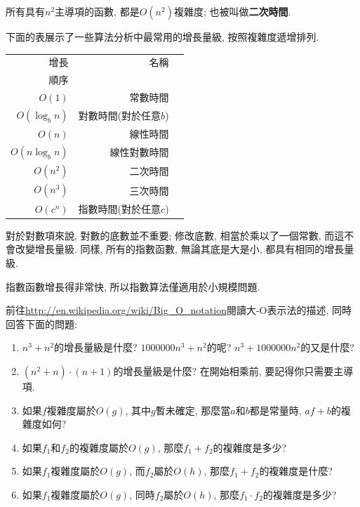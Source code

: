 \documentclass[10pt]{book}
\begin{document}
所有具有$n^2$主導項的函數, 都是$O(n^2)$複雜度; 也被叫做{\bf 二次時間}. 

下面的表展示了一些算法分析中最常用的增長量級, 
按照複雜度遞增排列. 

\begin{tabular}{|r|r|r|}
\hline
增長     &   名稱      \\
順序      &               \\
\hline
$O(1)$             & 常數時間 \\
$O(\log_b n)$      & 對數時間(對於任意$b$) \\
$O(n)$             & 線性時間 \\
$O(n \log_b n)$    & 線性對數時間 \\
$O(n^2)$           & 二次時間   \\
$O(n^3)$           & 三次時間   \\
$O(c^n)$           & 指數時間(對於任意$c$)  \\
\hline
\end{tabular}

對於對數項來說, 對數的底數並不重要;
修改底數, 相當於乘以了一個常數, 
而這不會改變增長量級. 
同樣, 所有的指數函數, 無論其底是大是小, 都具有相同的增長量級. 

指數函數增長得非常快, 所以指數算法僅適用於小規模問題. 


\begin{exercise}
前往\url{http://en.wikipedia.org/wiki/Big_O_notation}閱讀大-O表示法的描述, 
同時回答下面的問題:

\begin{enumerate}
\item $n^3 + n^2$的增長量級是什麼? $1000000 n^3 + n^2$的呢?
$n^3 + 1000000 n^2$的又是什麼?

\item $(n^2 + n) \cdot (n + 1)$的增長量級是什麼? 在開始相乘前, 要記得你只需要主導項. 

\item 如果$f$複雜度屬於$O(g)$, 其中$g$暫未確定, 那麼當$a$和$b$都是常量時, 
$af+b$的複雜度如何?

\item 如果$f_1$和$f_2$的複雜度屬於$O(g)$, 那麼$f_1 + f_2$的複雜度是多少?

\item 如果$f_1$複雜度屬於$O(g)$, 而$f_2$屬於$O(h)$, 那麼$f_1 + f_2$的複雜度是什麼?

\item 如果$f_1$複雜度屬於$O(g)$, 同時$f_2$屬於$O(h)$, 那麼$f_1 \cdot f_2$的複雜度是多少?
\end{enumerate}

\end{exercise}
\end{document}
